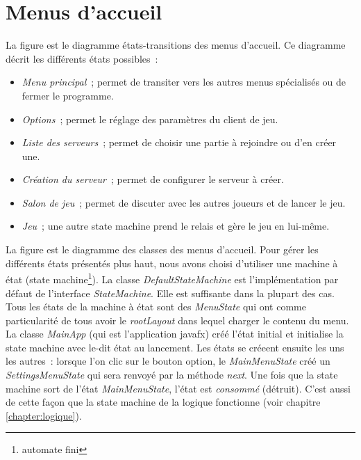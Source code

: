 \chapter{Menus d'accueil}\label{chapter:menu}

La figure  est le diagramme états-transitions des menus d'accueil.
Ce diagramme décrit les différents états possibles :
\begin{itemize}
    \item \emph{Menu principal} ; permet de transiter vers les autres menus spécialisés ou de fermer le programme.
    \item \emph{Options} ; permet le réglage des paramètres du client de jeu.
    \item \emph{Liste des serveurs} ; permet de choisir une partie à rejoindre ou d'en créer une.
    \item \emph{Création du serveur} ; permet de configurer le serveur à créer.
    \item \emph{Salon de jeu} ; permet de discuter avec les autres joueurs et de lancer le jeu.
    \item \emph{Jeu} ; une autre state machine prend le relais et gère le jeu en lui-même. %
\end{itemize}


\newpage
La figure  est le diagramme des classes des menus d'accueil.
Pour gérer les différents états présentés plus haut, nous avons choisi d'utiliser une machine à état
(state machine\footnote{automate fini}).
La classe \emph{DefaultStateMachine} est l'implémentation par défaut de l'interface \emph{StateMachine}.
Elle est suffisante dans la plupart des cas.
Tous les états de la machine à état sont des \emph{MenuState} qui ont comme particularité de tous avoir
le \emph{rootLayout} dans lequel charger le contenu du menu.
La classe \emph{MainApp} (qui est l'application javafx) créé l'état initial et initialise la state machine avec
le-dit état au lancement.
Les états se créeent ensuite les uns les autres : lorsque l'on clic sur le bouton option, le \emph{MainMenuState} créé un
\emph{SettingsMenuState} qui sera renvoyé par la méthode \emph{next}. Une fois que la state machine sort de l'état
\emph{MainMenuState}, l'état est \emph{consommé} (détruit). C'est aussi de cette façon que la state machine de
la logique fonctionne (voir chapitre \ref{chapter:logique}).


